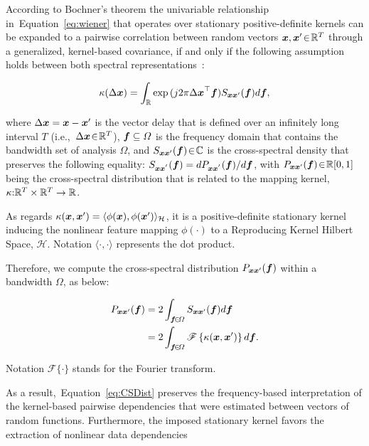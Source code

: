 According to Bochner's theorem the univariable relationship in~Equation~\eqref{eq:wiener} that operates over stationary positive-definite kernels can be expanded to a pairwise correlation between random vectors $\bm {x},\bm {x}'\negthinspace\in\negthinspace\mathbb{R}^T$ through a generalized, kernel-based covariance, if and only if the following assumption holds between both spectral representations~\cite{bochner2020harmonic}:
\begin{linenomath*}
	\begin{equation}\label{eq:kCSD}
		\kappa(\Delta\bm {x}) = \int_{\mathbb{R}} \exp{(j2\pi {\Delta\bm {x}}^{\top} \bm {f})} {S}_{\bm {x}\bm {x}'}(\bm {f})d\bm {f},
	\end{equation}
\end{linenomath*}
where $\Delta\bm {x}=\bm {x}-\bm {x}{'}$ is the vector delay that is defined over an infinitely long interval $T$ (i.e.,~$\Delta\bm {x}\negthinspace\in\negthinspace\mathbb{R}^T$), $\bm {f}\subseteq\varOmega$ is the frequency domain that contains the bandwidth set of analysis $\varOmega$, and $ {S}_{\bm {x}\bm {x}'}(\bm {f})\negthinspace\in\negthinspace \mathbb{C}$ is the cross-spectral density that preserves the following equality: $ {S}_{\bm {x}\bm {x}^{'}}(\bm {f}) = d {P}_{\bm {x}\bm {x}^{'}}(\bm {f})/d\bm {f}$, with $ {P}_{\bm {x}\bm {x}'}(\bm {f})\negthinspace\in\negthinspace\mathbb{R}[0,1]$ being the cross-spectral distribution that is related to the mapping kernel, $\kappa\negthickspace:\negthickspace\mathbb{R}^T \times \mathbb{R}^T\to \mathbb{R}$.

As regards $\kappa(\bm {x},\bm {x}') = \langle \phi(\bm {x}),\phi(\bm {x}') \rangle_{\mathcal{H}}$, it is a positive-definite stationary kernel inducing the nonlinear feature mapping $\phi(\cdot)$ to a Reproducing Kernel Hilbert Space, $\mathcal{H}$. Notation $\langle \cdot,\cdot \rangle$ represents the dot product. 

Therefore, we compute the cross-spectral distribution $ {P}_{\bm {x}\bm {x}'}(\bm {f})$ within a bandwidth $\varOmega$, as below:
\begin{linenomath*}
	\begin{align}\label{eq:CSDist}
		{P}_{\bm {x}\bm {x}'}(\bm {f}) &= 2\int_{\bm {f}\negthinspace\in\negthinspace\varOmega} {S}_{\bm {x}\bm {x}'}(\bm {f})d\bm {f}\nonumber\\
		&=2\int_{\bm {f}\negthinspace\in\negthinspace\varOmega} \mathscr{F}\left\{\kappa(\bm {x},\bm {x}')\right\}d\bm {f}.
	\end{align}
\end{linenomath*}

Notation $\mathscr{F}\{\cdot\}$ stands for the Fourier transform. 

As a result,~Equation~\eqref{eq:CSDist} preserves the frequency-based interpretation of the kernel-based pairwise dependencies that were estimated between vectors of random functions. Furthermore, the imposed stationary kernel favors the extraction of nonlinear data dependencies~\cite{bishop2006pattern}

